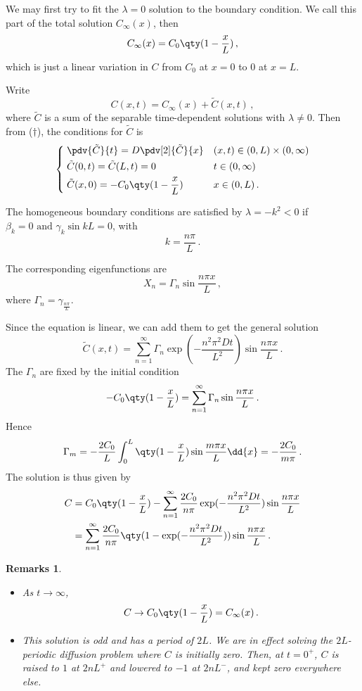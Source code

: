 \documentclass{article}
\theoremstyle{plain}\theoremheaderfont{\normalfont\itshape}\theorembodyfont{\rmfamily}\theoremseparator{.}\newtheorem*{rem}{Remark}\newtheorem*{ex}{Example}\newtheorem*{proof}{Proof}\newtheorem*{altp}{Alternative proof}
\theoremstyle{plain}\theoremheaderfont{\normalfont\bfseries}\theorembodyfont{\rmfamily}\theoremseparator{.}\newtheorem{thm}{Theorem}[section]\newtheorem{lem}[thm]{Lemma}\newtheorem{prop}[thm]{Proposition}\newtheorem*{cor}{Corollary}\newtheorem{defn}[thm]{Definition}\newtheorem{clm}[thm]{Claim}\newtheorem{clminproof}{Claim}
\theoremstyle{break}\theoremheaderfont{\normalfont\itshape}\theorembodyfont{\rmfamily}\theoremseparator{.\medskip}\newtheorem*{proofskip}{Proof}\newtheorem*{exs}{Examples}\newtheorem*{rems}{Remarks}
\theoremstyle{break}\theoremheaderfont{\normalfont\bfseries}\theorembodyfont{\rmfamily}\theoremseparator{.\medskip}\newtheorem{lemskip}[thm]{Lemma}\newtheorem{defnskip}[thm]{Definition}\newtheorem{propskip}[thm]{Proposition}\newtheorem{thmskip}[thm]{Theorem}
\numberwithin{equation}{section}
\begin{document}
	We may first try to fit the \(\lambda=0\) solution to the boundary condition. We call this part of the total solution \(C_\infty(x)\), then
	\[C_\infty(x)=C_0\qty(1-\frac{x}{L})\,,\]
	which is just a linear variation in \(C\) from \(C_0\) at \(x=0\) to \(0\) at \(x=L\).
	
	Write
	\[C(x,t)=C_\infty(x)+\tilde{C}(x,t)\,,\]
	where \(\tilde{C}\) is a sum of the separable time-dependent solutions with \(\lambda\ne 0\). Then from (\(\dagger\)), the conditions for \(\tilde{C}\) is
	\[\left\{\begin{aligned}
			& \;\pdv{\tilde{C}}{t}=D\pdv[2]{\tilde{C}}{x} && (x,t)\in(0,L)\times(0,\infty)\\
			& \;\tilde{C}(0,t)=\tilde{C}(L,t)=0 && t\in(0,\infty)\\
			& \;\tilde{C}(x,0)=-C_0\qty(1-\frac{x}{L}) && x\in(0,L)\,.
		\end{aligned}\right.\]
	
	The homogeneous boundary conditions are satisfied by \(\lambda=-k^2<0\) if \(\beta_k=0\text{ and }\gamma_k\sin kL=0\), with
	\[k=\frac{n\pi}{L}\,.\]
	
	The corresponding eigenfunctions are
	\[X_n=\Gamma_n\sin\frac{n\pi x}{L}\,,\]
	where \(\Gamma_n=\gamma_{\frac{n\pi}{L}}\).
	
	Since the equation is linear, we can add them to get the general solution
	\[\tilde{C}(x,t)=\sum_{n=1}^{\infty}\Gamma_n\exp(-\frac{n^2\pi^2 Dt}{L^2})\sin\frac{n\pi x}{L}\,.\]
	The \(\Gamma_n\) are fixed by the initial condition
	\[-C_0\qty(1-\frac{x}{L})=\sum_{n=1}^{\infty}\Gamma_n\sin\frac{n\pi x}{L}\,.\]
	Hence
	\[\Gamma_m=-\frac{2C_0}{L}\int_{0}^{L}\qty(1-\frac{x}{L})\sin\frac{m\pi x}{L}\dd{x}=-\frac{2C_0}{m\pi}\,.\]
	The solution is thus given by
	\begin{align*}
		C&=C_0\qty(1-\frac{x}{L})-\sum_{n=1}^{\infty}\frac{2C_0}{n\pi}\exp(-\frac{n^2\pi^2Dt}{L^2})\sin\frac{n\pi x}{L}\\
		&=\sum_{n=1}^{\infty}\frac{2C_0}{n\pi}\qty(1-\exp(-\frac{n^2\pi^2Dt}{L^2}))\sin\frac{n\pi x}{L}\,.
	\end{align*}

	\begin{rems}
		\begin{itemize}[topsep=0pt]
			\item As \(t\to\infty\),
			\[C\to C_0\qty(1-\frac{x}{L})=C_\infty(x)\,.\]
			\item This solution is odd and has a period of \(2L\). We are in effect solving the \(2L\)-periodic diffusion problem where \(C\) is initially zero. Then, at \(t=0^+\), \(C\) is raised to \(1\) at \(2nL^+\) and lowered to \(-1\) at \(2nL^-\), and kept zero everywhere else.
		\end{itemize}
	\end{rems}
	
\end{document}
